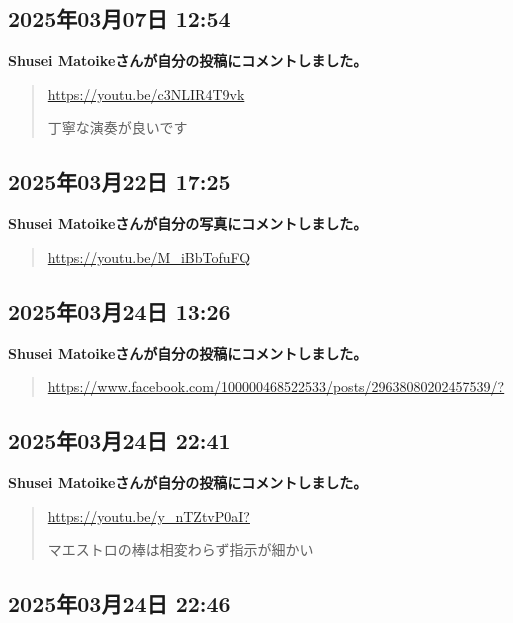 \subsection*{2025年03月07日 12:54}

\textbf{Shusei Matoikeさんが自分の投稿にコメントしました。}

\begin{quote}
\url{https://youtu.be/c3NLIR4T9vk}

丁寧な演奏が良いです
\end{quote}

\subsection*{2025年03月22日 17:25}

\textbf{Shusei Matoikeさんが自分の写真にコメントしました。}

\begin{quote}
\url{https://youtu.be/M_iBbTofuFQ}
\end{quote}

\subsection*{2025年03月24日 13:26}

\textbf{Shusei Matoikeさんが自分の投稿にコメントしました。}

\begin{quote}
\url{https://www.facebook.com/100000468522533/posts/29638080202457539/?}
\end{quote}

\subsection*{2025年03月24日 22:41}

\textbf{Shusei Matoikeさんが自分の投稿にコメントしました。}

\begin{quote}
\url{https://youtu.be/y_nTZtvP0aI?}

マエストロの棒は相変わらず指示が細かい
\end{quote}

\subsection*{2025年03月24日 22:46}

